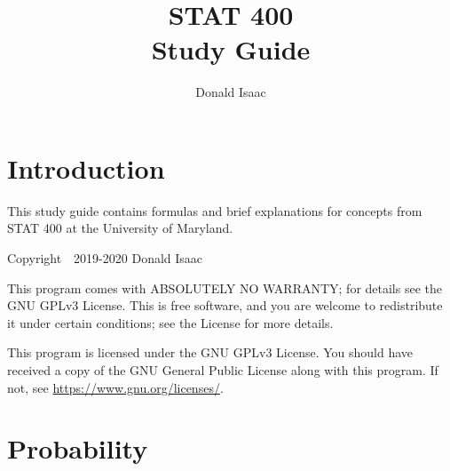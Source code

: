 \documentclass[10pt,twoside,a4paper]{article}
\newcommand{\version}{v1.0.0}
\begin{document}
\allsectionsfont{\fontsize{11}{12}\selectfont}

\title{%
	STAT 400 \\
	\large Study Guide
}
\author{Donald Isaac}

\pagestyle{fancy}
\chead{}
\rhead{\version} 

\cfoot{} 
\rfoot{\thepage}

\begin{multicols*}{2}
	
	\begin{framed}
		\maketitle
	\end{framed}
	\thispagestyle{fancy}
	\begin{flushleft}

	\section{Introduction}
	This study guide contains formulas and brief explanations for concepts
	from STAT 400 at the University of Maryland.
	\vspace{.5cm}

	Copyright~\textcopyright~2019-2020 Donald Isaac
	
	This program comes with ABSOLUTELY NO WARRANTY; for details see the GNU GPLv3
	License. This is free software, and you are welcome to redistribute it under
	certain conditions; see the License for more details.

	This program is licensed under the GNU GPLv3 License. You should have 
	received a copy of the GNU General Public License along with this program.
	If not, see \href{https://www.gnu.org/licenses/}{https://www.gnu.org/licenses/}.
	

	\section{Probability}

\end{flushleft}
\end{multicols*}
\end{document}
